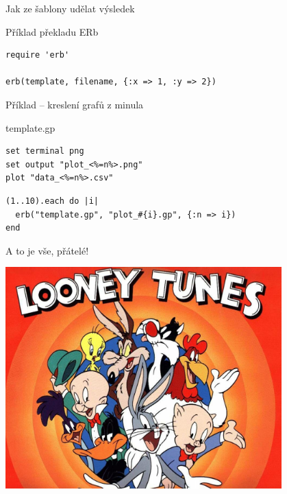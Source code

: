 \documentclass{beamer}
\begin{document}
\begin{frame}[fragile]{Jak ze šablony udělat výsledek}
  \scriptsize
  \begin{block}{Příklad překladu ERb}
    \scriptsize
    \begin{verbatim}
require 'erb'

erb(template, filename, {:x => 1, :y => 2})
    \end{verbatim}
  \end{block}
\end{frame}

\begin{frame}[fragile]{Příklad -- kreslení grafů z minula}
  \begin{block}{template.gp}
    \scriptsize
    \begin{verbatim}
set terminal png
set output "plot_<%=n%>.png"
plot "data_<%=n%>.csv"
    \end{verbatim}
  \end{block}
  \begin{block}{}
    \scriptsize
    \begin{verbatim}
(1..10).each do |i|
  erb("template.gp", "plot_#{i}.gp", {:n => i})
end
    \end{verbatim}
  \end{block}
\end{frame}


\begin{frame}{A to je vše, přátelé!}
  \begin{center}
    \includegraphics[width=0.8\textwidth]{looney_tunes}
  \end{center}
\end{frame}
\end{document}
